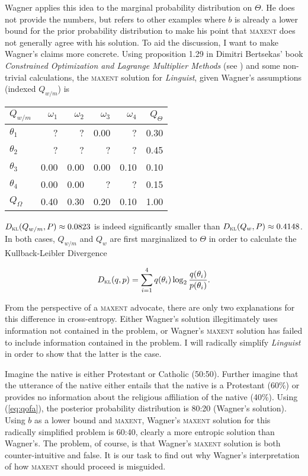 \documentclass[11pt]{article}
\begin{document}
Wagner applies this idea to the marginal probability distribution on
$\Theta$. He does not provide the numbers, but refers to other
examples where $b$ is already a lower bound for the prior probability
distribution to make his point that \textsc{maxent} does not generally
agree with his solution. To aid the discussion, I want to make
Wagner's claims more concrete. Using proposition 1.29 in Dimitri
Bertsekas' book \emph{Constrained Optimization and Lagrange Multiplier
  Methods} (see ) and some non-trivial
calculations, the \textsc{maxent} solution for \emph{Linguist},
given Wagner's assumptions (indexed $Q_{w/m}$) is

\medskip

\begin{tabular}{|l|r|r|r|r|r|}\hline
  $Q_{w/m}$ & $\omega_{1}$ & $\omega_{2}$ & $\omega_{3}$ & $\omega_{4}$ & $Q_{\Theta}$ \\ \hline
$\theta_{1}$ & ? & ? & 0.00 & ? & 0.30 \\ \hline
$\theta_{2}$ & ? & ? & ? & ? & 0.45 \\ \hline
$\theta_{3}$ & 0.00 & 0.00 & 0.00 & 0.10 & 0.10 \\ \hline
$\theta_{4}$ & 0.00 & 0.00 & ? & ? & 0.15 \\ \hline
$Q_{\Omega}$ & 0.40 & 0.30 & 0.20 & 0.10 & 1.00\\ \hline
\end{tabular}

\medskip

$D_{\textsc{kl}}(Q_{w/m},P)\approx{}0.0823$ is indeed significantly
smaller than $D_{\textsc{kl}}(Q_{w},P)\approx{}0.4148$. In both cases,
$Q_{w/m}$ and $Q_{w}$ are first marginalized to $\Theta$ in order to
calculate the Kullback-Leibler Divergence

\begin{equation}
  \label{eq:kl}
  D_{\textsc{kl}}(q,p)=\sum_{i=1}^{4}q(\theta_{i})\log_{2}\frac{q(\theta_{i})}{p(\theta_{i})}.
\end{equation}

From the perspective of a \textsc{maxent} advocate, there are only
two explanations for this difference in cross-entropy. Either
Wagner's solution illegitimately uses information not contained in
the problem, or Wagner's \textsc{maxent} solution has failed to
include information contained in the problem. I will radically
simplify \emph{Linguist} in order to show that the latter is
the case. 

Imagine the native is either Protestant or Catholic (50:50).
Further imagine that the utterance of the native either entails
that the native is a Protestant (60\%) or provides no information
about the religious affiliation of the native (40\%). Using
(\ref{eq:qofa}), the posterior probability distribution is 80:20
(Wagner's solution). Using $b$ as a lower bound and
\textsc{maxent}, Wagner's \textsc{maxent} solution for this
radically simplified problem is 60:40, clearly a more entropic
solution than Wagner's. The problem, of course, is that 
Wagner's \textsc{maxent} solution is both counter-intuitive and
false. It is our task to find out why Wagner's interpretation of
how \textsc{maxent} should proceed is misguided.
\end{document}
